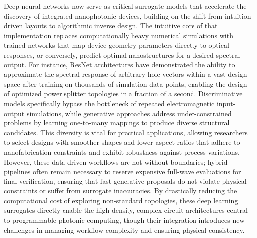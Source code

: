 \documentclass[11pt]{article}
\begin{document}
Deep neural networks now serve as critical surrogate models that accelerate the discovery of integrated nanophotonic devices, building on the shift from intuition-driven layouts to algorithmic inverse design. The intuitive core of that implementation replaces computationally heavy numerical simulations with trained networks that map device geometry parameters directly to optical responses, or conversely, predict optimal nanostructures for a desired spectral output. For instance, ResNet architectures have demonstrated the ability to approximate the spectral response of arbitrary hole vectors within a vast design space after training on thousands of simulation data points, enabling the design of optimized power splitter topologies in a fraction of a second. Discriminative models specifically bypass the bottleneck of repeated electromagnetic input-output simulations, while generative approaches address under-constrained problems by learning one-to-many mappings to produce diverse structural candidates. This diversity is vital for practical applications, allowing researchers to select designs with smoother shapes and lower aspect ratios that adhere to nanofabrication constraints and exhibit robustness against process variations. However, these data-driven workflows are not without boundaries; hybrid pipelines often remain necessary to reserve expensive full-wave evaluations for final verification, ensuring that fast generative proposals do not violate physical constraints or suffer from surrogate inaccuracies. By drastically reducing the computational cost of exploring non-standard topologies, these deep learning surrogates directly enable the high-density, complex circuit architectures central to programmable photonic computing, though their integration introduces new challenges in managing workflow complexity and ensuring physical consistency. \citep{doi_10_1038_s41598_018_37952_2_076b64f9} \citep{doi_10_29026_oes_2022_210012_27973a69} \citep{doi_10_1109_access_2026_3697666_bd5258a6}
\end{document}
